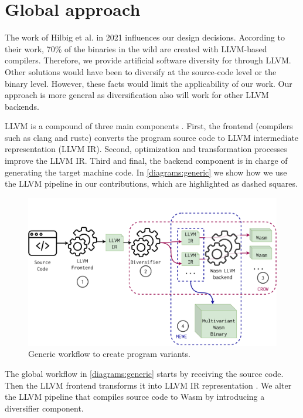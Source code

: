 \section{Global approach}
\label{tech:generic}


The work of Hilbig et al. \cite{Hilbig2021AnES} in 2021 influences our design decisions. According to their work, 70\% of the \wasm binaries in the wild are created with LLVM-based compilers. Therefore, we provide artificial software diversity for \wasm through LLVM. 
Other solutions would have been to diversify at the source-code level or the \wasm binary level. However, these facts would limit the applicability of our work.
Our approach is more general as diversification also will work for other LLVM backends.

LLVM is a compound of three main components \cite{llvmofficialweb}. First, the frontend (compilers such as clang and rustc) converts the program source code to LLVM intermediate representation (LLVM IR). Second, optimization and transformation processes improve the LLVM IR. Third and final, the backend component is in charge of generating the target machine code. In \autoref{diagrams:generic} we show how we use the LLVM pipeline in our contributions, which are highlighted as dashed squares.

\begin{figure}[h]
    \includegraphics[width=\linewidth]{diagrams/architecture.pdf}
    \caption{Generic workflow to create \wasm program variants.}
    \label{diagrams:generic}
\end{figure}



The global workflow in \autoref{diagrams:generic} starts by receiving the source code. Then the LLVM frontend transforms it into LLVM IR representation . 
We alter the LLVM pipeline that compiles source code to Wasm by introducing a diversifier component.  

